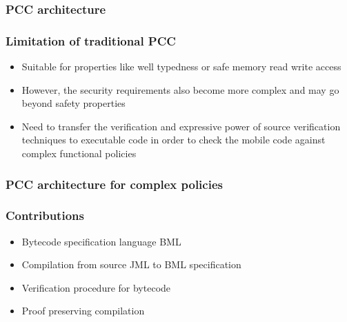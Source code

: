 \documentclass{beamer}
\begin{document}
\begin{frame}
\frametitle[shrink]{PCC architecture}
\begin{center}
\end{center}
\end{frame}

\begin{frame}
\frametitle{Limitation of traditional PCC}
\begin{itemize}
 \item Suitable for properties like
       well typedness or safe memory read write access 
 \item However,%
       the security requirements also become more complex and 
       may go beyond safety properties 
            
  \item  Need to transfer the verification and expressive power of source verification techniques
        to executable code  in order to check the mobile code against complex functional policies 

\end{itemize}
\end{frame}


\begin{frame}[shrink]\frametitle{PCC architecture for complex policies}
   \begin{center}
   \end{center}
\end{frame}


\begin{frame}\frametitle{Contributions}   
  \begin{itemize}
     \item Bytecode specification language BML
     \item Compilation from source JML to BML specification
     \item Verification procedure for bytecode 
     \item Proof preserving compilation
\end{itemize}
\end{frame} 






\end{document}
